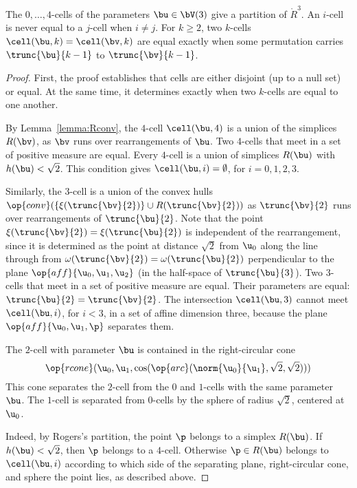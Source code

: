 \begin{lemma}  The $0,\ldots,4$-cells of the parameters $\bu\in  \bV(3)$
give a partition of $\ring{R}^3$.  An $i$-cell is never equal to a
$j$-cell when $i\ne j$. For $k\ge 2$, two $k$-cells
$\cell(\bu,k)=\cell(\bv,k)$ are equal exactly when some permutation carries
$\trunc{\bu}{k-1}$ to
 $\trunc{\bv}{k-1}$.
\end{lemma}

\begin{proof} First, the proof establishes that cells are either
disjoint (up to a null set) or equal.  At the same time, it
determines exactly when two $k$-cells are equal to one another.

By Lemma~\ref{lemma:Rconv}, the $4$-cell $\cell(\bu,4)$ is a union
of the simplices $R(\bv)$, as $\bv$ runs over rearrangements of $\bu$.
Two $4$-cells that meet in a set of positive measure are equal.
Every $4$-cell is a union of simplices $R(\bu)$ with
$h(\bu)<\sqrt2$.  This condition gives $\cell(\bu,i)=\emptyset$, for
$i=0,1,2,3$.

Similarly, the $3$-cell is a union of the convex hulls
$\op{conv}(\{\xi(\trunc{\bv}{2})\}\cup R(\trunc{\bv}{2}))$ as $\trunc{\bv}{2}$ runs over
rearrangements of $\trunc{\bu}{2}$.  Note that the point
$\xi(\trunc{\bv}{2})=\xi(\trunc{\bu}{2})$ is independent of the rearrangement, since
it is determined as the point at distance $\sqrt2$ from $ \u_0$
along the line through from $\omega(\trunc{\bv}{2})=\omega(\trunc{\bu}{2})$
perpendicular to the plane $\op{aff}\{ \u_0, \u_1, \u_2\}$ (in the
half-space of $\trunc{\bu}{3}$). Two $3$-cells that meet in a set of
positive measure are equal.  Their parameters are equal:
$\trunc{\bu}{2}=\trunc{\bv}{2}$.  The intersection $\cell(\bu,3)$ cannot meet
$\cell(\bu,i)$, for $i<3$, in a set of affine dimension three, because the
plane $\op{aff}\{ \u_0, \u_1,\p\}$ separates them.

The $2$-cell with parameter $\bu$ is contained in the right-circular cone
\begin{displaymath}
\op{rcone}( \u_0, \u_1,\cos(\op{arc}(\norm{ \u_0}{ \u_1},\sqrt2,\sqrt2)))
\end{displaymath}
This cone separates the $2$-cell from the $0$ and $1$-cells with the
same parameter $\bu$.  The $1$-cell is separated from $0$-cells by the
sphere of radius $\sqrt2$, centered at $ \u_0$.

Indeed, by Rogers's partition, the point $\p$ belongs to a simplex
$R(\bu)$.  If $h(\bu)<\sqrt2$, then $\p$ belongs to a $4$-cell.
Otherwise $\p\in R(\bu)$ belongs to $\cell(\bu,i)$ according to which
side of the separating plane, right-circular cone, and sphere the
point lies, as described above.
\end{proof}


